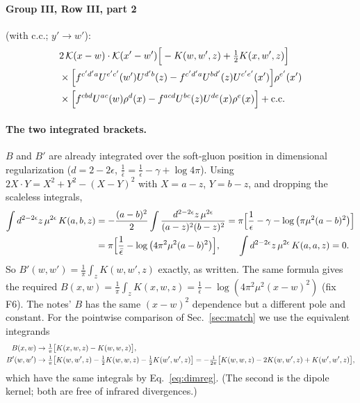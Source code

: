 \documentclass[10pt]{article}
\numberwithin{equation}{section}
\newcommand{\KK}{\mathcal K}
\begin{document}
\paragraph{Group III, Row III, part 2} (with c.c.; $y'\to w'$):
\begin{align}
&2\,\KK(x-w)\cdot\KK(x'-w')\Big[-K(w,w',z)+\tfrac12K(x,w',z)\Big]\notag\\
&\times\Big[f^{c'd'a}U^{e'c'}(w')U^{d'b}(z)-f^{c'd'a}U^{bd'}(z)U^{c'e'}(x')\Big]\rho^{e'}(x')\notag\\
&\times\Big[f^{cbd}U^{ac}(w)\rho^d(x)-f^{acd}U^{bc}(z)U^{de}(x)\rho^e(x)\Big]+{\rm c.c.}
\end{align}

\paragraph{The two integrated brackets.} $B$ and $B'$ are already integrated over the soft-gluon position in dimensional regularization ($d=2-2\epsilon$, $\frac1{\bar\epsilon}=\frac1\epsilon-\gamma+\log4\pi$). Using $2X\cdot Y=X^2+Y^2-(X-Y)^2$ with $X=a-z$, $Y=b-z$, and dropping the scaleless integrals,
\begin{align}
\int d^{2-2\epsilon}z\,\mu^{2\epsilon}\,K(a,b,z)&=-\frac{(a-b)^2}{2}\int\frac{d^{2-2\epsilon}z\,\mu^{2\epsilon}}{(a-z)^2(b-z)^2}=\pi\Big[\frac1\epsilon-\gamma-\log\big(\pi\mu^2(a-b)^2\big)\Big]\notag\\
&=\pi\Big[\frac1{\bar\epsilon}-\log\big(4\pi^2\mu^2(a-b)^2\big)\Big],\qquad\int d^{2-2\epsilon}z\,\mu^{2\epsilon}\,K(a,a,z)=0.
\label{eq:dimreg}
\end{align}
So $B'(w,w')=\frac1\pi\int_zK(w,w',z)$ exactly, as written. The same formula gives the required $B(x,w)=\frac1\pi\int_zK(x,w,z)=\frac1{\bar\epsilon}-\log(4\pi^2\mu^2(x-w)^2)$ (fix F6). The notes' $B$ has the same $(x-w)^2$ dependence but a different pole and constant. For the pointwise comparison of Sec.~\ref{sec:match} we use the equivalent integrands
\begin{align}
B(x,w)&\to\tfrac1\pi\big[K(x,w,z)-K(w,w,z)\big],\notag\\
B'(w,w')&\to\tfrac1\pi\big[K(w,w',z)-\tfrac12K(w,w,z)-\tfrac12K(w',w',z)\big]=-\tfrac1{2\pi}\big[K(w,w,z)-2K(w,w',z)+K(w',w',z)\big],
\end{align}
which have the same integrals by Eq.~\eqref{eq:dimreg}. (The second is the dipole kernel; both are free of infrared divergences.)
\end{document}
